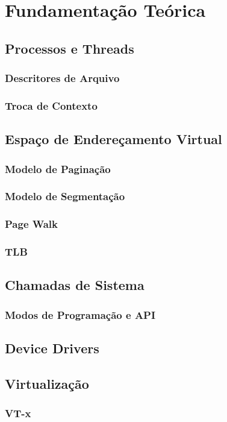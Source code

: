 \chapter{Fundamentação Teórica}
\label{cap:fundamentacao-teorica}

\section{Processos e Threads}
\label{sec:processos-e-threads}

\subsection{Descritores de Arquivo}

\subsection{Troca de Contexto}

\section{Espaço de Endereçamento Virtual}

\subsection{Modelo de Paginação}

\subsection{Modelo de Segmentação}

\subsection{Page Walk}

\subsection{TLB}

\section{Chamadas de Sistema}

\subsection{Modos de Programação e API}

\section{Device Drivers}
\label{sec:dd}

\section{Virtualização}

\subsection{VT-x}

